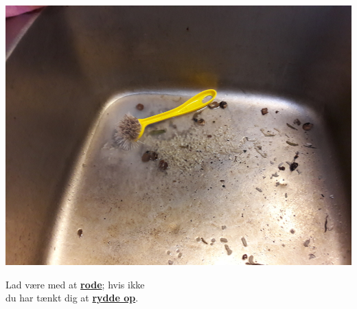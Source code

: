 \documentclass{article}
\begin{document}
\maketitle

\null
\vspace{-1.5cm}


\vspace{0.1in}

\begin{center}

\includegraphics[scale=0.4]{billeder/beskidt-vask.jpg}

\end{center}

\vspace{0.2in}

\begin{center}

{\fontsize{30}{40}\selectfont Lad være med at \textbf{\underline{rode}}; hvis
ikke\\ \vspace{0.1in} du har tænkt dig at \textbf{\underline{rydde op}}.}

\end{center}

\dansk

\underskriv
\end{document}
